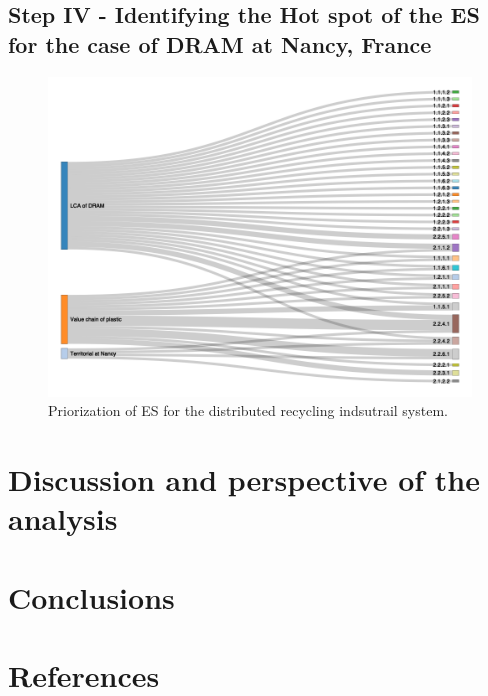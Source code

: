 \documentclass[]{elsarticle} %
\begin{document}
\hypertarget{step-iv---identifying-the-hot-spot-of-the-es-for-the-case-of-dram-at-nancy-france}{%
\subsection{Step IV - Identifying the Hot spot of the ES for the case of DRAM at Nancy, France}\label{step-iv---identifying-the-hot-spot-of-the-es-for-the-case-of-dram-at-nancy-france}}

\begin{landscape}
\begin{figure}
\includegraphics[width=1\linewidth]{Figures/Sankey} \caption{Priorization of ES for the distributed recycling indsutrail system.}\label{fig:fig-sankey}
\end{figure}
\end{landscape}

\hypertarget{discussion-and-perspective-of-the-analysis}{%
\section{Discussion and perspective of the analysis}\label{discussion-and-perspective-of-the-analysis}}

\hypertarget{conclusions}{%
\section{Conclusions}\label{conclusions}}

\newpage

\hypertarget{references}{%
\section*{References}\label{references}}
\end{document}

